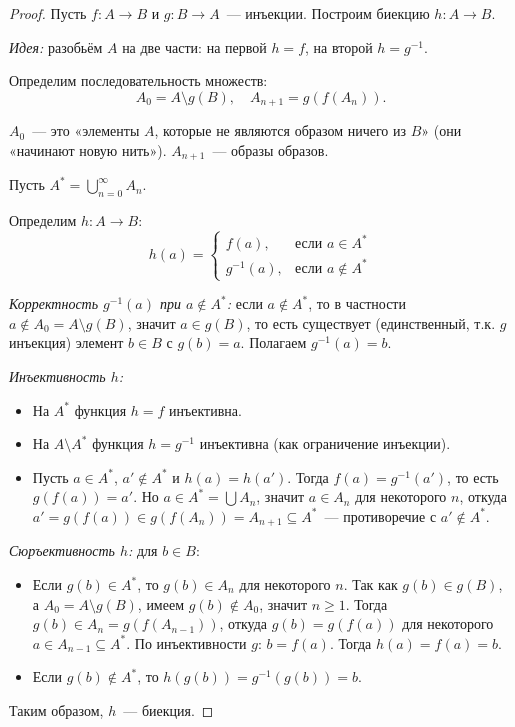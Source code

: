 \documentclass[12pt]{article}
\begin{document}
	\begin{proof}
		Пусть $f: A \to B$ и $g: B \to A$~--- инъекции. Построим биекцию $h: A \to B$.
		
		\textit{Идея:} разобьём $A$ на две части: на первой $h = f$, на второй $h = g^{-1}$.
		
		Определим последовательность множеств:
		\[A_0 = A \setminus g(B), \quad A_{n+1} = g(f(A_n)).\]
		
		$A_0$~--- это «элементы $A$, которые не являются образом ничего из $B$» (они «начинают новую нить»). $A_{n+1}$~--- образы образов.
		
		Пусть $A^* = \bigcup_{n=0}^{\infty} A_n$.
		
		Определим $h: A \to B$:
		\[h(a) = \begin{cases} f(a), & \text{если } a \in A^* \\ g^{-1}(a), & \text{если } a \notin A^* \end{cases}\]
		
		\textit{Корректность $g^{-1}(a)$ при $a \notin A^*$:} если $a \notin A^*$, то в частности $a \notin A_0 = A \setminus g(B)$, значит $a \in g(B)$, то есть существует (единственный, т.к. $g$ инъекция) элемент $b \in B$ с $g(b) = a$. Полагаем $g^{-1}(a) = b$.
		
		\textit{Инъективность $h$:}
		\begin{itemize}
			\item На $A^*$ функция $h = f$ инъективна.
			\item На $A \setminus A^*$ функция $h = g^{-1}$ инъективна (как ограничение инъекции).
			\item Пусть $a \in A^*$, $a' \notin A^*$ и $h(a) = h(a')$. Тогда $f(a) = g^{-1}(a')$, то есть $g(f(a)) = a'$. Но $a \in A^* = \bigcup A_n$, значит $a \in A_n$ для некоторого $n$, откуда $a' = g(f(a)) \in g(f(A_n)) = A_{n+1} \subseteq A^*$~--- противоречие с $a' \notin A^*$.
		\end{itemize}
		
		\textit{Сюръективность $h$:} для $b \in B$:
		\begin{itemize}
			\item Если $g(b) \in A^*$, то $g(b) \in A_n$ для некоторого $n$. Так как $g(b) \in g(B)$, а $A_0 = A \setminus g(B)$, имеем $g(b) \notin A_0$, значит $n \geqslant 1$. Тогда $g(b) \in A_n = g(f(A_{n-1}))$, откуда $g(b) = g(f(a))$ для некоторого $a \in A_{n-1} \subseteq A^*$. По инъективности $g$: $b = f(a)$. Тогда $h(a) = f(a) = b$.
			\item Если $g(b) \notin A^*$, то $h(g(b)) = g^{-1}(g(b)) = b$.
		\end{itemize}
		
		Таким образом, $h$~--- биекция.
	\end{proof}
	
\end{document}
